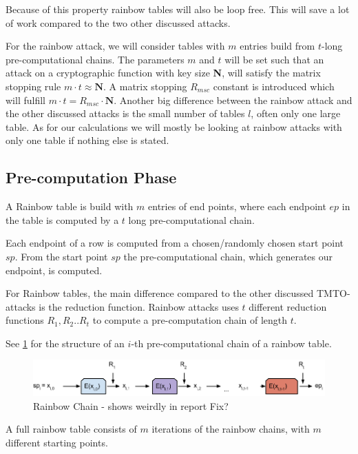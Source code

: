 Because of this property rainbow tables will also be loop free. This
will save a lot of work compared to the two other discussed attacks.

For the rainbow attack, we will consider tables with $m$ entries build
from $t$-long pre-computational chains. The parameters $m$ and $t$
will be set such that an attack on a cryptographic
function with key size \textbf{N}, will satisfy the matrix
stopping rule $m \cdot t \approx \textbf{N}$. A matrix stopping $R_{msc}$
constant is introduced which will fulfill $m\cdot t = R_{msc} \cdot
\textbf{N}$. Another big difference between the rainbow attack and the
other discussed attacks is the small number of tables $l$, often only
one large table. As for our calculations we will mostly be looking at
rainbow attacks with only one table if nothing else is stated.

\subsection{Pre-computation Phase}

A Rainbow table is build with $m$ entries of end points, where each endpoint
$ep$ in the table is computed by a $t$ long pre-computational chain.

Each endpoint of a row is computed from a chosen/randomly chosen
start point $sp$. From the start point $sp$ the pre-computational chain,
which generates our endpoint, is computed.

For Rainbow tables, the main difference compared to the other
discussed TMTO-attacks is the reduction function. Rainbow attacks
uses $t$ different reduction functions $R_1,R_2..R_t$ to compute a pre-computation
chain of length $t$.

See \ref{fig:rainbowchain} for the structure of an $i$-th
pre-computational chain of a rainbow table.

\begin{figure}[H]
  \centering
  \includegraphics[scale=0.4]{figures/rainbowchain.png}
  \caption{Rainbow Chain - shows weirdly in report Fix?}
  \label{fig:rainbowchain}
\end{figure}

A full rainbow table consists of $m$ iterations of the rainbow chains,
with $m$ different starting points.


